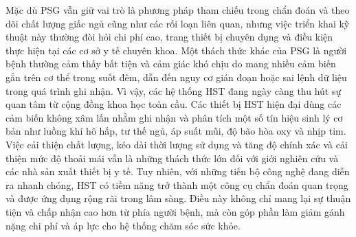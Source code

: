 Mặc dù PSG vẫn giữ vai trò là phương pháp tham chiếu trong chẩn đoán và theo dõi chất lượng giấc ngủ cũng như các rối loạn liên quan, nhưng việc triển khai kỹ thuật này thường đòi hỏi chi phí cao, trang thiết bị chuyên dụng và điều kiện thực hiện tại các cơ sở y tế chuyên khoa. Một thách thức khác của PSG là người bệnh thường cảm thấy bất tiện và cảm giác khó chịu do mang nhiều cảm biến gắn trên cơ thể trong suốt đêm, dẫn đến nguy cơ gián đoạn hoặc sai lệnh dữ liệu trong quá trình ghi nhận. Vì vậy, các hệ thống HST đang ngày càng thu hút sự quan tâm từ cộng đồng khoa học toàn cầu\cite{e3hst}\cite{hstSurvey}\cite{hst_paper}. Các thiết bị HST hiện đại dùng các cảm biến không xâm lấn nhằm ghi nhận và phân tích một số tín hiệu sinh lý cơ bản như luồng khí hô hấp, tư thế ngủ, áp suất mũi, độ bão hòa oxy và nhịp tim. Việc cải thiện chất lượng, kéo dài thời lượng sử dụng và tăng độ chính xác và cải thiện mức độ thoải mái vẫn là những thách thức lớn đối với giới nghiên cứu và các nhà sản xuất thiết bị y tế. Tuy nhiên, với những tiến bộ công nghệ đang diễn ra nhanh chóng, HST có tiềm năng trở thành một công cụ chẩn đoán quan trọng và được ứng dụng rộng rãi trong lâm sàng. Điều này không chỉ mang lại sự thuận tiện và chấp nhận cao hơn từ phía người bệnh, mà còn góp phần làm giảm gánh nặng chi phí và áp lực cho hệ thống chăm sóc sức khỏe.

